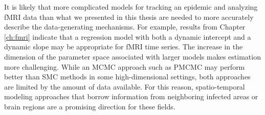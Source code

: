 It is likely that more complicated models for tracking an epidemic \citep{Sham:Kars:pnas:2012, Bhad:Ioni:mala:2011} and analyzing fMRI data \citep{buxton:balloon:1998} than what we presented in this thesis are needed to more accurately describe the data-generating mechanisms. For example, results from Chapter \ref{ch:fmri} indicate that a regression model with both a dynamic intercept and a dynamic slope may be appropriate for fMRI time series. The increase in the dimension of the parameter space associated with larger models makes estimation more challenging. While an MCMC approach such as PMCMC may perform better than SMC methods in some high-dimensional settings, both approaches are limited by the amount of data available. For this reason, spatio-temporal modeling approaches that borrow information from neighboring infected areas or brain regions are a promising direction for these fields.